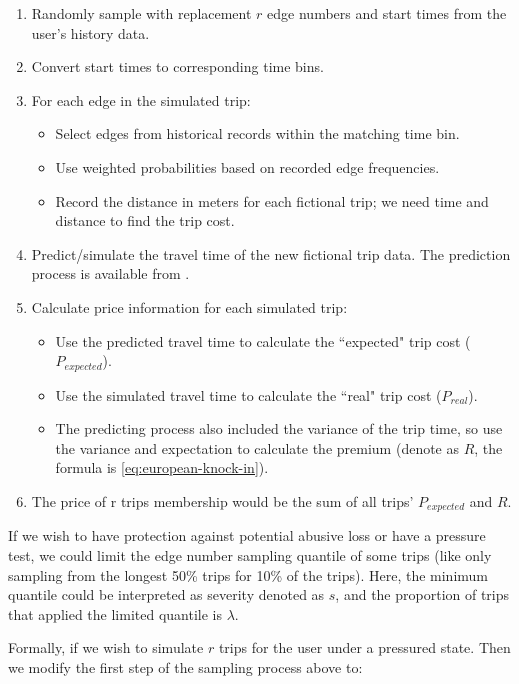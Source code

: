 \documentclass[12pt]{article}
\begin{document}
{{{{{{\begin{appendices}
\begin{enumerate}
        \item Randomly sample with replacement $r$ edge numbers and start times from the user's history data.
        \item Convert start times to corresponding {time bins}.
        \item For each edge in the simulated trip:
        \begin{itemize}
            \item Select edges from historical records within the matching time bin.
            \item Use weighted probabilities based on recorded edge frequencies.
            \item Record the distance in meters for each fictional trip; we need time and distance to find the trip cost.
        \end{itemize}
        \item Predict/simulate the travel time of the new fictional trip data. The prediction process is available from \cite{elmasri2020predictive}.
        \item Calculate price information for each simulated trip:
        \begin{itemize}
            \item Use the predicted travel time to calculate the ``expected" trip cost ($P_{expected}$).
            \item Use the simulated travel time to calculate the ``real" trip cost ($P_{real}$).
            \item The predicting process also included the variance of the trip time, so use the variance and expectation to calculate the premium (denote as $R$, the formula is \ref{eq:european-knock-in}).
        \end{itemize}
        \item The price of r trips membership would be the sum of all trips' $P_{expected}$ and $R$.

    
\end{enumerate}

If we wish to have protection against potential abusive loss or have a pressure test, we could limit the edge number sampling quantile of some trips (like only sampling from the longest 50\% trips for 10\% of the trips). Here, the minimum quantile could be interpreted as severity denoted as $s$, and the proportion of trips that applied the limited quantile is $\lambda$. 

Formally, if we wish to simulate $r$ trips for the user under a pressured state. Then we modify the first step of the sampling process above to:


\end{appendices}}}}}}}
\end{document}
